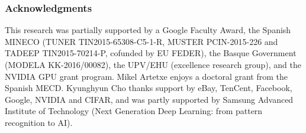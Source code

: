 \documentclass{article} \usepackage{iclr2018_conference,times}
\begin{document}
\subsubsection*{Acknowledgments}

This research was partially supported by a Google Faculty Award, the Spanish MINECO (TUNER TIN2015-65308-C5-1-R, MUSTER PCIN-2015-226 and TADEEP TIN2015-70214-P, cofunded by EU FEDER), the Basque Government (MODELA KK-2016/00082), the UPV/EHU  (excellence research group), and the NVIDIA GPU grant program. Mikel Artetxe enjoys a doctoral grant from the Spanish MECD. Kyunghyun Cho thanks support by eBay, TenCent, Facebook, Google, NVIDIA and CIFAR, and was partly supported by Samsung Advanced Institute of Technology (Next Generation Deep Learning: from pattern recognition to AI).




\end{document}
